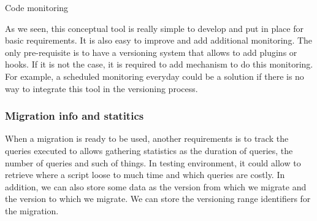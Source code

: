\begin{algorithm}
	\caption{Code monitoring}
	\label{pcode:monitoringPseudo}
	\begin{algorithmic}[1]
		\State {}
		\State {}
		\State
		\State {}
		\State {}
		\State
		\State {}
		\State {}
		\State {}
		\State
		\State {}
		\State {}
		\State
		\State {}
			\State {}
			\State
			\State {}
				\State {}
				\State {}
			\EndFor 
		\EndIf
		\State
		\State {}
	\end{algorithmic}
\end{algorithm}

As we seen, this conceptual tool is really simple to develop and put in place for basic requirements. It is also easy to improve and add additional monitoring. The only pre-requisite is to have a versioning system that allows to add plugins or hooks. If it is not the case, it is required to add mechanism to do this monitoring. For example, a scheduled monitoring everyday could be a solution if there is no way to integrate this tool in the versioning process.

\subsubsection{Migration info and statitics\\}
	\label{sec:migInfoAndStats}

When a migration is ready to be used, another requirements is to track the queries executed to allows gathering statistics as the duration of queries, the number of queries and such of things. In testing environment, it could allow to retrieve where a script loose to much time and which queries are costly. In addition, we can also store some data as the version from which we migrate and the version to which we migrate. We can store the versioning range identifiers for the migration.


